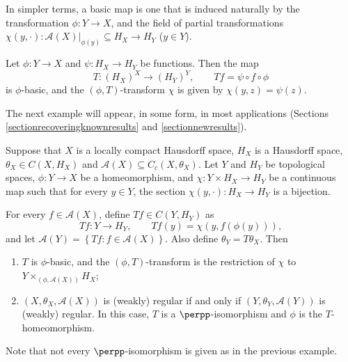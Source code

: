 In simpler terms, a basic map is one that is induced naturally by the transformation $\phi:Y\to X$, and the field of partial transformations $\chi(y,\cdot):\mathcal{A}(X)|_{\phi(y)}\subseteq H_X\to H_Y$ ($y\in Y$).

\begin{example}
Let $\phi:Y\to X$ and $\psi:H_X\to H_Y$ be functions. Then the map
\[T:(H_X)^X\to (H_Y)^Y,\qquad Tf=\psi\circ f\circ \phi\]
is $\phi$-basic, and the $(\phi,T)$-transform $\chi$ is given by $\chi(y,z)=\psi(z)$.
\end{example}

The next example will appear, in some form, in most applications (Sections \ref{sectionrecoveringknownresults} and \ref{sectionnewresults}).

\begin{example}
Suppose that $X$ is a locally compact Hausdorff space, $H_X$ is a Hausdorff space, $\theta_X\in C(X,H_X)$ and $\mathcal{A}(X)\subseteq C_c(X,\theta_X)$. Let $Y$ and $H_Y$ be topological spaces, $\phi:Y\to X$ be a homeomorphism, and $\chi:Y\times H_X\to H_Y$ be a continuous map such that for every $y\in Y$, the section $\chi(y,\cdot):H_X\to H_Y$ is a bijection.

For every $f\in\mathcal{A}(X)$, define $Tf\in C(Y,H_Y)$ as
\[Tf:Y\to H_Y,\qquad Tf(y)=\chi(y,f(\phi(y))),\]
and let $\mathcal{A}(Y)=\left\{Tf:f\in\mathcal{A}(X)\right\}$. Also define $\theta_Y=T\theta_X$. Then
\begin{enumerate}
\item $T$ is $\phi$-basic, and the $(\phi,T)$-transform is the restriction of $\chi$ to $Y\times_{(\phi,\mathcal{A}(X))} H_X$;
\item $(X,\theta_X,\mathcal{A}(X))$ is (weakly) regular if and only if $(Y,\theta_Y,\mathcal{A}(Y))$ is (weakly) regular. In this case, $T$ is a $\perpp$-isomorphism and $\phi$ is the $T$-homeomorphism.
\end{enumerate}
\end{example}

Note that not every $\perpp$-isomorphism is given as in the previous example.

